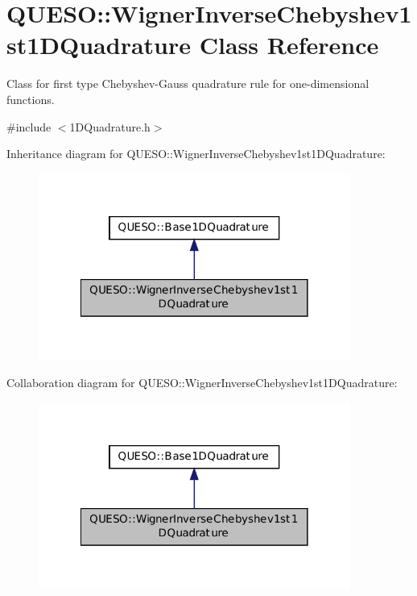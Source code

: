 \hypertarget{class_q_u_e_s_o_1_1_wigner_inverse_chebyshev1st1_d_quadrature}{\section{Q\-U\-E\-S\-O\-:\-:Wigner\-Inverse\-Chebyshev1st1\-D\-Quadrature Class Reference}
\label{class_q_u_e_s_o_1_1_wigner_inverse_chebyshev1st1_d_quadrature}
}


Class for first type Chebyshev-\/\-Gauss quadrature rule for one-\/dimensional functions.  




{\ttfamily \#include $<$1\-D\-Quadrature.\-h$>$}



Inheritance diagram for Q\-U\-E\-S\-O\-:\-:Wigner\-Inverse\-Chebyshev1st1\-D\-Quadrature\-:
\nopagebreak
\begin{figure}[H]
\begin{center}
\leavevmode
\includegraphics[width=290pt]{class_q_u_e_s_o_1_1_wigner_inverse_chebyshev1st1_d_quadrature__inherit__graph}
\end{center}
\end{figure}


Collaboration diagram for Q\-U\-E\-S\-O\-:\-:Wigner\-Inverse\-Chebyshev1st1\-D\-Quadrature\-:
\nopagebreak
\begin{figure}[H]
\begin{center}
\leavevmode
\includegraphics[width=290pt]{class_q_u_e_s_o_1_1_wigner_inverse_chebyshev1st1_d_quadrature__coll__graph}
\end{center}
\end{figure}
